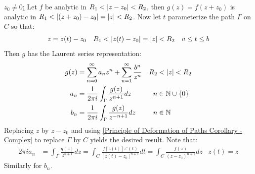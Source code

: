 \documentclass[12pt, english]{book}
\makeatletter
\renewenvironment{proof}[1][\proofname]{\par
	\pushQED{\qed}%
	\normalfont \topsep6\p@\@plus6\p@\relax
	\list{}{%
		\settowidth{\leftmargin}{\itshape\proofname:\hskip\labelsep}%
		\setlength{\labelwidth}{0pt}%
		\setlength{\itemindent}{-\leftmargin}%
		}%
	\item[\hskip\labelsep\itshape#1\@addpunct{:}]\ignorespaces
	}{\popQED\endlist\@endpefalse}
\makeatother
\begin{document}
\begin{proof}
		\underline{\(z_0 \neq 0\):} \newline
		Let \(f\) be analytic in \(R_1 < \abs{z-z_0} < R_2\), then \(g(z) = f(z + z_0)\) is analytic in \(R_1 < \abs{(z+z_0) - z_0} = \abs{z} < R_2\). Now let \(t\) parameterize the path \(\Gamma\) on \(C\) so that:
		\begin{align*}
			z &= z(t) - z_0 & R_1 &< \abs{z(t) - z_0} = \abs{z} < R_2 & a \leq t \leq b
		\end{align*}
		Then \(g\) has the Laurent series representation:
		\begin{align*}
			g(z) &= \sum_{n=0}^{\infty} a_n z^n + \sum_{n=1}^{\infty} \frac{b^n}{z^n} &
				R_2 &< \abs{z} < R_2 \\
			a_n &= \frac{1}{2\pi i} \int_\Gamma \frac{g(z)}{z^{n+1}} dz & n &\in \mathbb{N} \cup \{0\} \\
			b_n &= \frac{1}{2\pi i} \int_\Gamma \frac{g(z)}{z^{-n+1}} dz & n &\in \mathbb{N}
		\end{align*}
		Replacing \(z\) by \(z - z_0\) and using \cref{Principle of Deformation of Paths Corollary - Complex} to replace \(\Gamma\) by \(C\) yields the desired result. Note that: 
		\begin{align*}
			2\pi i a_n 
			&= \int_\Gamma \frac{g(z)}{z^{n+1}} dz 
			 = \int_{C} \frac{f[z(t)]z'(t)}{[z(t) - z_0]^{n+1}} dt = \int_{C} \frac{f(z)}{(z-z_0)^{n+1}} dz & z(t) = z
		\end{align*}
		Similarly for \(b_n\).
	\end{proof}
\end{document}
